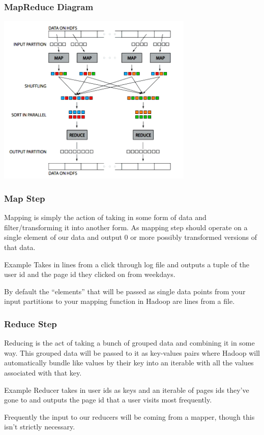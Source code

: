 \documentclass{beamer}
\begin{document}
\begin{frame}
  \frametitle{MapReduce Diagram}
  \centering
  \includegraphics[width=0.7\textwidth]{../images/shuffle_sort.png}
\end{frame}

\begin{frame}
  \frametitle{Map Step}
  Mapping is simply the action of taking in some form of data and filter/transforming it into another form. As mapping step should operate on a single element of our data and output 0 or more possibly transformed versions of that data. \pause

  \vspace{4mm}
  \begin{block}{Example}
    Takes in lines from a click through log file and outputs a tuple of the user id and the page id they clicked on from weekdays.
  \end{block} \pause
  \vspace{4mm}

  By default the ``elements'' that will be passed as single data points from your input partitions to your mapping function in Hadoop are lines from a file.
\end{frame}

\begin{frame}
  \frametitle{Reduce Step}
  Reducing is the act of taking a bunch of grouped data and combining it in some way. This grouped data will be passed to it as key-values pairs where Hadoop will automatically bundle like values by their key into an iterable with all the values associated with that key. \pause

  \vspace{4mm}
  \begin{block}{Example}
    Reducer takes in user ids as keys and an iterable of pages ids they've gone to and outputs the page id that a user visits most frequently.
  \end{block} \pause
  \vspace{4mm}

  Frequently the input to our reducers will be coming from a mapper, though this isn't strictly necessary.
\end{frame}
\end{document}
